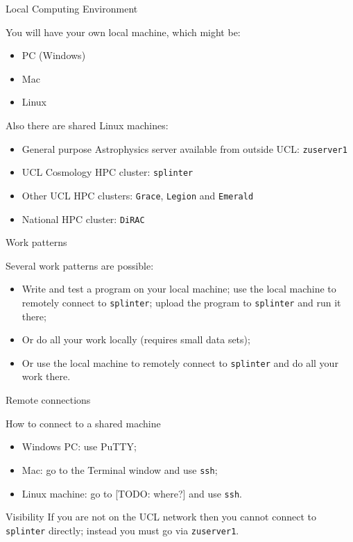 \documentclass{beamer}
\begin{document}
\begin{frame}{Local Computing Environment}
  \begin{block}{You will have your own local machine, which might be:}
    \begin{itemize}
      \item PC (Windows)
      \item Mac
      \item Linux
    \end{itemize}
  \end{block}
  \begin{block}{Also there are shared Linux machines:}
    \begin{itemize}
      \item General purpose Astrophysics server available from outside UCL: \alert{\texttt{zuserver1}}
      \item UCL Cosmology HPC cluster: \alert{\texttt{splinter}}
      \item Other UCL HPC clusters: \alert{\texttt{Grace}}, \alert{\texttt{Legion}} and \alert{\texttt{Emerald}}
      \item National HPC cluster: \alert{\texttt{DiRAC}}
    \end{itemize}
  \end{block}
\end{frame}

\begin{frame}{Work patterns}
  \begin{block}{Several work patterns are possible:}
    \begin{itemize}
      \item Write and test a program on your local machine; use the local machine to remotely connect to \texttt{splinter}; upload the program to \texttt{splinter} and run it there;
      \item Or do all your work locally (requires small data sets);
      \item Or use the local machine to remotely connect to \texttt{splinter} and do all your work there.
    \end{itemize}
  \end{block}
\end{frame}

\begin{frame}{Remote connections}
  \begin{block}{How to connect to a shared machine}
    \begin{itemize}
      \item Windows PC: use PuTTY;
      \item Mac: go to the Terminal window and use \texttt{ssh};
      \item Linux machine: go to [TODO: where?] and use \texttt{ssh}.
    \end{itemize}
  \end{block}
  \begin{block}{Visibility}
    If you are not on the UCL network then you cannot connect to \texttt{splinter} directly; instead you must go via \texttt{zuserver1}.
  \end{block}
\end{frame}
\end{document}
